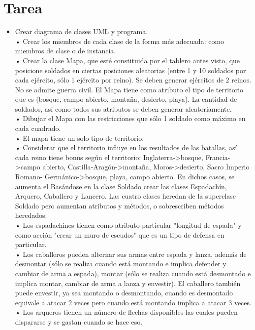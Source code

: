 \documentclass{article}
\begin{document}
	\section{Tarea}
	\begin{itemize}		
        \item Crear diagrama de clases UML y programa.\\
		• Crear los miembros de cada clase de la forma más adecuada: como miembros
		de clase o de instancia.\\
		• Crear la clase Mapa, que esté constituida por el tablero antes visto, que
		posicione soldados en ciertas posiciones aleatorias (entre 1 y 10 soldados por
		cada ejército, sólo 1 ejército por reino). Se deben generar ejércitos de 2 reinos.
		No se admite guerra civil. El Mapa tiene como atributo el tipo de territorio que
		es (bosque, campo abierto, montaña, desierto, playa). La cantidad de soldados,
		así como todos sus atributos se deben generar aleatoriamente.\\
		• Dibujar el Mapa con las restricciones que sólo 1 soldado como máximo en cada
		cuadrado.\\
		• El mapa tiene un solo tipo de territorio.\\
		• Considerar que el territorio influye en los resultados de las batallas, así cada
		reino tiene bonus según el territorio: Inglaterra->bosque, Francia->campo abierto, Castilla-Aragón->montaña, Moros->desierto, Sacro Imperio Romano-
		Germánico->bosque, playa, campo abierto. En dichos casos, se aumenta el Basándose en la clase Soldado crear las clases Espadachín, Arquero, Caballero
		y Lancero. Las cuatro clases heredan de la superclase Soldado pero aumentan
		atributos y métodos, o sobrescriben métodos heredados.\\
		• Los espadachines tienen como atributo particular "longitud de espada" y como
		acción "crear un muro de escudos" que es un tipo de defensa en particular.\\
		• Los caballeros pueden alternar sus armas entre espada y lanza, además de
		desmontar (sólo se realiza cuando está montando e implica defender y cambiar
		de arma a espada), montar (sólo se realiza cuando está desmontado e implica
		montar, cambiar de arma a lanza y envestir). El caballero también puede
		envestir, ya sea montando o desmontando, cuando es desmontado equivale a
		atacar 2 veces pero cuando está montando implica a atacar 3 veces.\\
		• Los arqueros tienen un número de flechas disponibles las cuales pueden
		dispararse y se gastan cuando se hace eso.\\

\end{itemize}
\end{document}
